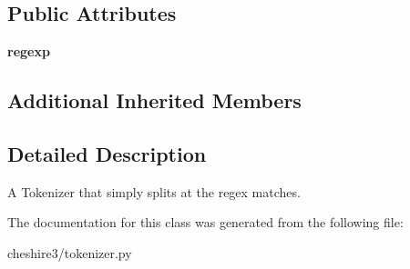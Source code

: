 \subsection*{Public Attributes}
\begin{DoxyCompactItemize}
\item 
\hypertarget{classcheshire3_1_1tokenizer_1_1_regexp_split_tokenizer_a100f76c4704f0cf42f6737a36ca7c293}{{\bfseries regexp}}\label{classcheshire3_1_1tokenizer_1_1_regexp_split_tokenizer_a100f76c4704f0cf42f6737a36ca7c293}

\end{DoxyCompactItemize}
\subsection*{Additional Inherited Members}


\subsection{Detailed Description}
\begin{DoxyVerb}A Tokenizer that simply splits at the regex matches.\end{DoxyVerb}
 

The documentation for this class was generated from the following file\-:\begin{DoxyCompactItemize}
\item 
cheshire3/tokenizer.\-py\end{DoxyCompactItemize}
